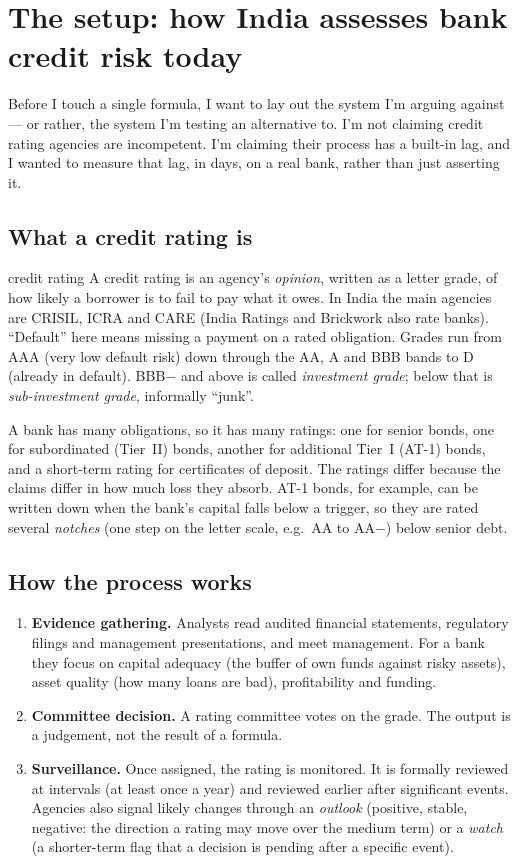 \section{The setup: how India assesses bank credit risk today}

Before I touch a single formula, I want to lay out the system I'm arguing against — or rather, the system I'm testing an alternative to. I'm not claiming credit rating agencies are incompetent. I'm claiming their process has a built-in lag, and I wanted to measure that lag, in days, on a real bank, rather than just asserting it.

\subsection{What a credit rating is}
\begin{defbox}{credit rating}
A credit rating is an agency's \emph{opinion}, written as a letter grade, of how likely a borrower is to fail to pay what it owes. In India the main agencies are CRISIL, ICRA and CARE (India Ratings and Brickwork also rate banks). ``Default'' here means missing a payment on a rated obligation. Grades run from AAA (very low default risk) down through the AA, A and BBB bands to D (already in default). BBB$-$ and above is called \emph{investment grade}; below that is \emph{sub-investment grade}, informally ``junk''.
\end{defbox}

A bank has many obligations, so it has many ratings: one for senior bonds, one for subordinated (Tier~II) bonds, another for additional Tier~I (AT-1) bonds, and a short-term rating for certificates of deposit. The ratings differ because the claims differ in how much loss they absorb. AT-1 bonds, for example, can be written down when the bank's capital falls below a trigger, so they are rated several \emph{notches} (one step on the letter scale, e.g.\ AA to AA$-$) below senior debt.

\subsection{How the process works}
\begin{enumerate}
\item \textbf{Evidence gathering.} Analysts read audited financial statements, regulatory filings and management presentations, and meet management. For a bank they focus on capital adequacy (the buffer of own funds against risky assets), asset quality (how many loans are bad), profitability and funding.
\item \textbf{Committee decision.} A rating committee votes on the grade. The output is a judgement, not the result of a formula.
\item \textbf{Surveillance.} Once assigned, the rating is monitored. It is formally reviewed at intervals (at least once a year) and reviewed earlier after significant events. Agencies also signal likely changes through an \emph{outlook} (positive, stable, negative: the direction a rating may move over the medium term) or a \emph{watch} (a shorter-term flag that a decision is pending after a specific event).
\end{enumerate}

